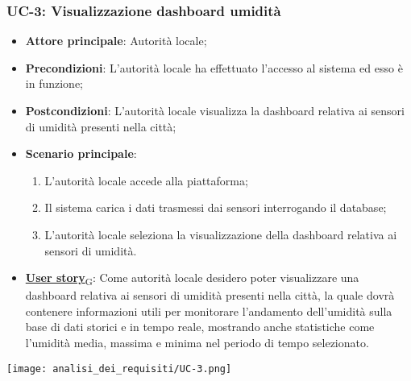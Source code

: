 \subsubsection{UC-3: Visualizzazione dashboard umidità}
\begin{itemize}
	\item \textbf{Attore principale}: Autorità locale;
	\item \textbf{Precondizioni}: L'autorità locale ha effettuato l'accesso al sistema ed esso è in funzione;
	\item \textbf{Postcondizioni}: L'autorità locale visualizza la dashboard relativa
	      ai sensori di umidità presenti nella città;
	\item \textbf{Scenario principale}:
	      \begin{enumerate}
		      \item L'autorità locale accede alla piattaforma;
		      \item Il sistema carica i dati trasmessi dai sensori interrogando il database;
		      \item L'autorità locale seleziona la visualizzazione della dashboard relativa ai sensori di umidità.
	      \end{enumerate}
	\item \href{https://7last.github.io/docs/rtb/documentazione-interna/glossario\#user-story}{\textbf{User story}\textsubscript{G}}:
	      Come autorità locale desidero poter visualizzare una dashboard relativa ai sensori di umidità presenti nella città, la quale
	      dovrà contenere informazioni utili per monitorare l'andamento dell'umidità sulla base di dati storici e in tempo reale, mostrando
	      anche statistiche come l'umidità media, massima e minima nel periodo di tempo selezionato.
\end{itemize}
\begin{center}
	\texttt{[image: analisi\_dei\_requisiti/UC-3.png]}
\end{center}

